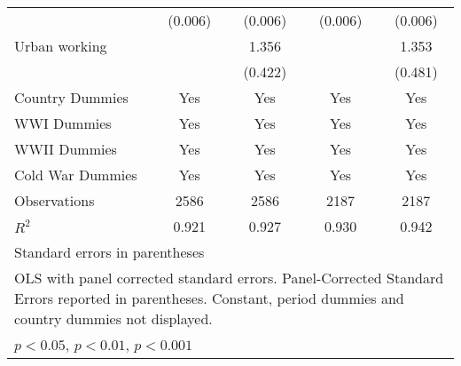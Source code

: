\begin{table}[htbp]
\begin{tabular}{l*{4}{c}}
                    &     (0.006)         &     (0.006)         &     (0.006)         &     (0.006)         \\
[1em]
Urban working       &                     &       1.356\sym{**} &                     &       1.353\sym{**} \\
                    &                     &     (0.422)         &                     &     (0.481)         \\
[1em]
Country Dummies     &         Yes         &         Yes         &         Yes         &         Yes         \\
[1em]
WWI Dummies         &         Yes         &         Yes         &         Yes         &         Yes         \\
[1em]
WWII Dummies        &         Yes         &         Yes         &         Yes         &         Yes         \\
[1em]
Cold War Dummies    &         Yes         &         Yes         &         Yes         &         Yes         \\
\hline
Observations        &        2586         &        2586         &        2187         &        2187         \\
\(R^{2}\)           &       0.921         &       0.927         &       0.930         &       0.942         \\
\hline\hline
\multicolumn{5}{l}{\footnotesize Standard errors in parentheses}\\
\multicolumn{5}{l}{\footnotesize OLS with panel corrected standard errors. Panel-Corrected Standard Errors reported in parentheses. Constant, period dummies and country dummies not displayed.}\\
\multicolumn{5}{l}{\footnotesize \sym{*} \(p<0.05\), \sym{**} \(p<0.01\), \sym{***} \(p<0.001\)}\\
\end{tabular}
\end{table}
